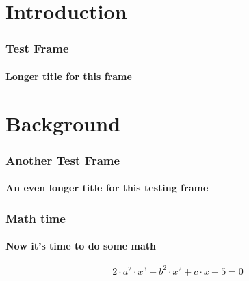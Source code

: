 



\section{Introduction}

\begin{frame}[label=TESTFRAME]
\frametitle{Test Frame}
\framesubtitle{Longer title for this frame}

\lipsum[4]

\end{frame}



\section{Background}

\begin{frame}[label=TESTFRAME2]
\frametitle{Another Test Frame}
\framesubtitle{An even longer title for this testing frame}

\lipsum[4]

\end{frame}


\begin{frame}[label=MATHFRAME]
\frametitle{Math time}
\framesubtitle{Now it's time to do some math}

\lipsum[2]

\begin{equation}
2 \cdot a^{2} \cdot x^{3} - b^{2} \cdot x^{2} + c \cdot x + 5 = 0
\end{equation}


\end{frame}

